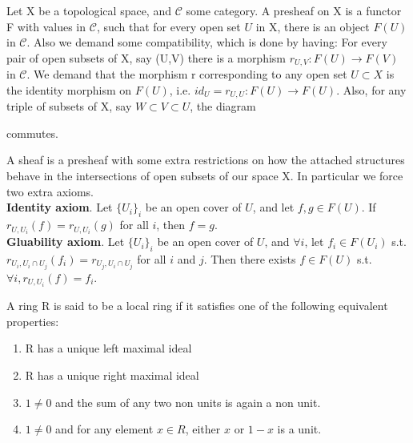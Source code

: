 \begin{definition}\label{Def:Presheaf}
%
Let X be a topological space, and \(\mathcal{C}\) some category. A presheaf on X is a functor F with values in \(\mathcal{C}\), such that for every open set \(U\) in X, there is an object \(F(U)\) in \(\mathcal{C}\). Also we demand some compatibility, which is done by having:
For every pair of open subsets of X, say (U,V) there is a morphism \(r_{U,V}:F(U)\longrightarrow F(V)\) in \(\mathcal{C}\). We demand that the morphism r corresponding to any open set \(U \subset X\) is the identity morphism on \(F(U)\), i.e. \(id_U = r_{U,U}:F(U)\longrightarrow F(U)\). Also, for any triple of subsets of X, say \(W\subset V\subset U\), the diagram
\begin{center}
     commutes.
%
\end{center}
%
\end{definition}
%
\begin{definition}\label{Def:Sheaf}
%
A sheaf is a presheaf with some extra restrictions on how the attached structures behave in the intersections of open subsets of our space X. In particular we force two extra axioms. \\
%
\textbf{Identity axiom}. Let \(\{U_i\}_i\) be an open cover of \(U\), and let \(f,g\in F(U)\). If \(r_{U,U_i}(f) = r_{U, U_i}(g)\) for all \(i\), then \(f = g\). \\
%
\textbf{Gluability axiom}. Let \(\{U_i\}_i\) be an open cover of \(U\), and \(\forall i\), let \(f_i \in F(U_i)\) s.t. \(r_{U_i, U_i\cap U_j}(f_i) = r_{U_j, U_i \cap U_j}\) for all \(i\) and \(j\).  Then there exists \(f\in F(U) \) s.t. \(\forall i, r_{U, U_i}(f) = f_i \).
%
\end{definition}
%
\begin{definition}\label{Def:Local ring}
A ring R is said to be a local ring if it satisfies one of the following equivalent properties:
\begin{enumerate}
    \item R has a unique left maximal ideal
    \item R has a unique right maximal ideal
    \item \(1 \neq 0\) and the sum of any two non units is again a non unit. 
    \item \(1 \neq 0\) and for any element \(x\in R\), either \(x\) or \(1-x\) is a unit. 
\end{enumerate}
\end{definition}

